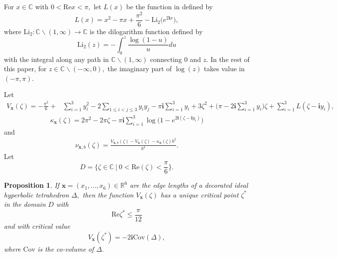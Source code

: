 \documentclass[11pt]{article}
\renewcommand{\setminus}{{\smallsetminus}}
\newtheorem{proposition}[theorem]{Proposition}
\theoremstyle{remark}
\theoremstyle{remark}
\numberwithin{equation}{section}
\begin{document}
For $x\in\mathbb C$ with $0<\mathrm{Re}x<\pi,$ let $L(x)$ be the function in \cite[Formula (2.7)]{LMSWY} defined by 
\begin{equation}\label{eq:Lx}
L(x)=x^2-\pi x +\frac{\pi^2}{6}-\mathrm{Li}_2\big(e^{2\mathbf ix}\big),
\end{equation}
where $\mathrm{Li}_2: \mathbb C\setminus (1,\infty)\to\mathbb C$ is the dilogarithm function defined by
$$\mathrm{Li}_2(z)=-\int_0^z\frac{\log (1-u)}{u}du$$
with the integral along any path in $\mathbb C\setminus (1,\infty)$ connecting $0$ and $z.$ In the rest of this paper, for $z\in \mathbb C \setminus (-\infty,0),$ the imaginary part of $\log(z)$ takes value in $(-\pi,\pi).$





Let 
\begin{equation}\label{Vx}
\begin{split}
    V_{\boldsymbol x}(\zeta)=-\frac{\pi^2}{6}+&\sum_{i=1}^3y_i^2-2\sum_{1\leqslant i< j\leqslant 3}y_iy_j-\pi\mathbf i \sum_{i=1}^3y_i + 3\zeta^2+\bigg(\pi-2\mathbf i \sum_{i=1}^3y_i\bigg)\zeta+\sum_{i=1}^3L(\zeta-\mathbf i y_i),
\end{split}
\end{equation}
\begin{equation}\label{kappa}
\begin{split}
    \kappa_{\boldsymbol x}(\zeta)= 2\pi^2 -2\pi \zeta  -\pi \mathbf i \sum_{i=1}^3 \log \Big(1-e^{2\mathbf i (\zeta-\mathbf i y_i) }\Big)
\end{split}
\end{equation}
and 
\begin{equation}\label{nu}
\begin{split}
    \nu_{\boldsymbol x,b}(\zeta)=\frac{V_{\boldsymbol x,b}(\zeta)-V_{\boldsymbol x}(\zeta)-\kappa_{\boldsymbol x}(\zeta)b^2}{b^4}.
\end{split}
\end{equation}
Let 
$$D=\Big\{ \zeta\in\mathbb C\ \Big|\ 0<\mathrm{Re}(\zeta)<\frac{\pi}{6} \Big\}.$$


\begin{proposition}\label{critical2}
    If $\boldsymbol x=(x_1,\dots, x_6)\in\mathbb R^6$  are the edge lengths of a decorated ideal hyperbolic tetrahedron $\Delta,$ then the function $V_{\boldsymbol x}(\zeta)$ has a unique critical point $\zeta^*$ in the domain $D$ with 
    \begin{equation}\label{12}
    \mathrm{Re}\zeta^*\leqslant \frac{\pi}{12}   
    \end{equation}
    and with critical value
    $$V_{\boldsymbol x}(\zeta^*)=-2\mathbf i \mathrm{Cov}(\Delta),$$
    where $\mathrm{Cov}$ is the co-volume of $\Delta.$
\end{proposition}
\end{document}
